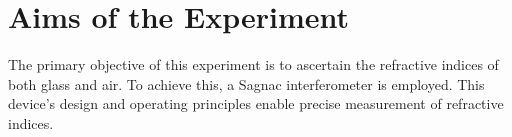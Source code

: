\section{Aims of the Experiment}
\label{sec:aims}
The primary objective of this experiment is to ascertain 
the refractive indices of both glass and air. To achieve this,
a Sagnac interferometer is employed. This device's
design and operating principles enable precise measurement 
of refractive indices.